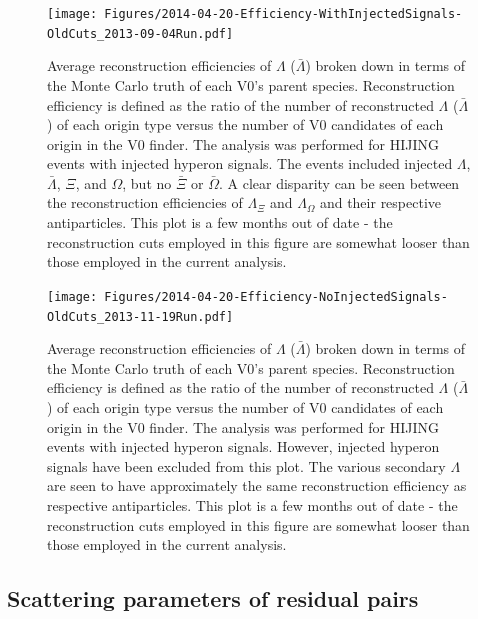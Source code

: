 \begin{figure}[hbtp]
\texttt{[image: Figures/2014-04-20-Efficiency-WithInjectedSignals-OldCuts\_2013-09-04Run.pdf]}
\caption[$Lambda$ reconstruction efficiencies with injected signals]{Average reconstruction efficiencies of $\Lambda$ ($\bar{\Lambda}$) broken down in terms of the Monte Carlo truth of each V0's parent species.  Reconstruction efficiency is defined as the ratio of the number of reconstructed $\Lambda$ ($\bar{\Lambda}$) of each origin type versus the number of V0 candidates of each origin in the V0 finder.  The analysis was performed for HIJING events with injected hyperon signals.  The events included injected $\Lambda$, $\bar{\Lambda}$, $\Xi$, and $\Omega$, but no $\bar{\Xi}$ or $\bar{\Omega}$.  A clear disparity can be seen between the reconstruction efficiencies of $\Lambda_{\Xi}$ and $\Lambda_{\Omega}$ and their respective antiparticles.  This plot is a few months out of date - the reconstruction cuts employed in this figure are somewhat looser than those employed in the current analysis.}
\label{fig:MCEfficiencyWithInjected}
\end{figure}

\begin{figure}[hbtp]
\texttt{[image: Figures/2014-04-20-Efficiency-NoInjectedSignals-OldCuts\_2013-11-19Run.pdf]}
\caption[$Lambda$ reconstruction efficiencies without injected signals]{Average reconstruction efficiencies of $\Lambda$ ($\bar{\Lambda}$) broken down in terms of the Monte Carlo truth of each V0's parent species.  Reconstruction efficiency is defined as the ratio of the number of reconstructed $\Lambda$ ($\bar{\Lambda}$) of each origin type versus the number of V0 candidates of each origin in the V0 finder.  The analysis was performed for HIJING events with injected hyperon signals.  However, injected hyperon signals have been excluded from this plot.  The various secondary $\Lambda$ are seen to have approximately the same reconstruction efficiency as respective antiparticles.  This plot is a few months out of date - the reconstruction cuts employed in this figure are somewhat looser than those employed in the current analysis.}
\label{fig:MCEfficiencyNoInjected}
\end{figure}

\subsection{Scattering parameters of residual pairs}
\label{sec:ScatteringParams}


